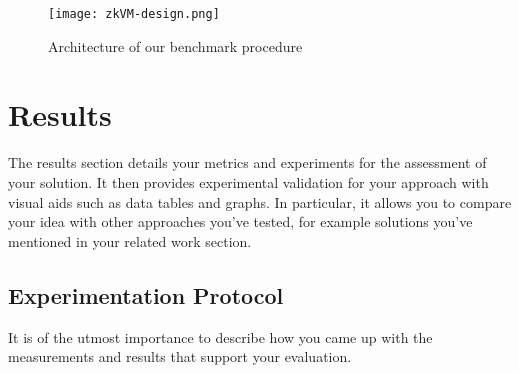 \documentclass{scrartcl}
\begin{document}
\begin{figure}[H]
	\begin{center}
		\texttt{[image: zkVM-design.png]}
	\end{center}
	\caption{Architecture of our benchmark procedure}
	\label{fig:ascent}
\end{figure}

\section{Results}

The results section details your metrics and experiments for the assessment of your solution. It then provides experimental validation for your approach with visual aids such as data tables and graphs. In particular, it allows you to compare your idea with other approaches you've tested, for example solutions you've mentioned in your related work section.

\subsection{Experimentation Protocol}

It is of the utmost importance to describe how you came up with the measurements and results that support your evaluation.
%
%
%
%
%
%
\end{document}
